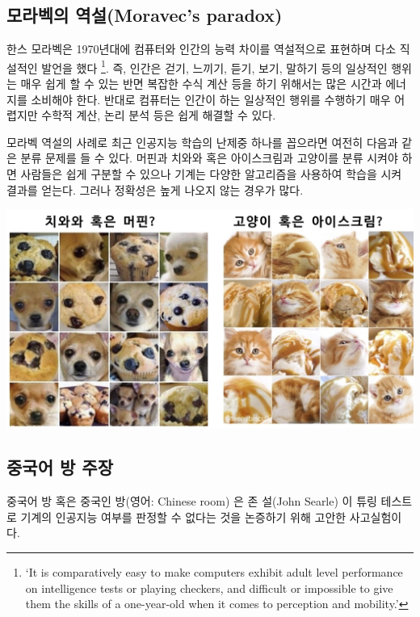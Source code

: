 \documentclass[smallextended]{svjour3}       %
\begin{document}
\hypertarget{uxbaa8uxb77cuxbca1uxc758-uxc5eduxc124moravecs-paradox}{%
\subsection{모라벡의 역설(Moravec's
paradox)}\label{uxbaa8uxb77cuxbca1uxc758-uxc5eduxc124moravecs-paradox}}

한스 모라벡은 1970년대에 컴퓨터와 인간의 능력 차이를 역설적으로 표현하며
다소 직설적인 발언을 했다 \footnote{`It is comparatively easy to make
  computers exhibit adult level performance on intelligence tests or
  playing checkers, and difficult or impossible to give them the skills
  of a one-year-old when it comes to perception and mobility.'}. 즉,
인간은 걷기, 느끼기, 듣기, 보기, 말하기 등의 일상적인 행위는 매우 쉽게
할 수 있는 반면 복잡한 수식 계산 등을 하기 위해서는 많은 시간과 에너지를
소비해야 한다. 반대로 컴퓨터는 인간이 하는 일상적인 행위를 수행하기 매우
어렵지만 수학적 계산, 논리 분석 등은 쉽게 해결할 수 있다.

모라벡 역설의 사례로 최근 인공지능 학습의 난제중 하나를 꼽으라면 여전히
다음과 같은 분류 문제를 들 수 있다. 머핀과 치와와 혹은 아이스크림과
고양이를 분류 시켜야 하면 사람들은 쉽게 구분할 수 있으나 기계는 다양한
알고리즘을 사용하여 학습을 시켜 결과를 얻는다. 그러나 정확성은 높게
나오지 않는 경우가 많다.

\begin{center}\includegraphics[width=1\linewidth]{fig/moravec-paradox} \end{center}

\hypertarget{chinese-room}{%
\subsection{중국어 방 주장}\label{chinese-room}}

중국어 방 혹은 중국인 방(영어: Chinese room) \cite{wikipedia_2019}은 존
설(John Searle) 이 튜링 테스트로 기계의 인공지능 여부를 판정할 수 없다는
것을 논증하기 위해 고안한 사고실험이다.
\end{document}
